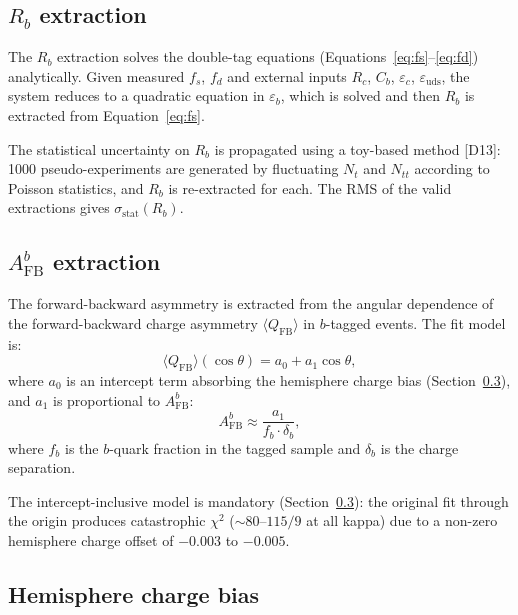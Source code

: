 \documentclass[11pt,a4paper]{article}
\begin{document}
\subsection{$R_b$ extraction}
\label{sec:stat_rb}

The $R_b$ extraction solves the double-tag equations (Equations~\ref{eq:fs}--\ref{eq:fd})
analytically. Given measured $f_s$, $f_d$ and external inputs $R_c$, $C_b$,
$\varepsilon_c$, $\varepsilon_\mathrm{uds}$, the system reduces to a quadratic
equation in $\varepsilon_b$, which is solved and then $R_b$ is extracted from
Equation~\ref{eq:fs}.

The statistical uncertainty on $R_b$ is propagated using a toy-based method [D13]:
1000 pseudo-experiments are generated by fluctuating $N_t$ and $N_{tt}$ according
to Poisson statistics, and $R_b$ is re-extracted for each. The RMS of the valid
extractions gives $\sigma_\mathrm{stat}(R_b)$.

\subsection{$A_\mathrm{FB}^b$ extraction}
\label{sec:stat_afb}

The forward-backward asymmetry is extracted from the angular dependence of the
forward-backward charge asymmetry $\langle Q_\mathrm{FB} \rangle$ in $b$-tagged events.
The fit model is:
\begin{equation}
\langle Q_\mathrm{FB} \rangle(\cos\theta) = a_0 + a_1 \cos\theta,
\label{eq:qfb_fit}
\end{equation}
where $a_0$ is an intercept term absorbing the hemisphere charge bias (Section~\ref{sec:afb_bias}),
and $a_1$ is proportional to $A_\mathrm{FB}^b$:
\begin{equation}
A_\mathrm{FB}^b \approx \frac{a_1}{f_b \cdot \delta_b},
\label{eq:afb_from_slope}
\end{equation}
where $f_b$ is the $b$-quark fraction in the tagged sample and $\delta_b$ is the
charge separation.

The intercept-inclusive model is mandatory (Section~\ref{sec:afb_bias}): the original
fit through the origin produces catastrophic $\chi^2$ ($\sim 80$--$115/9$ at all kappa)
due to a non-zero hemisphere charge offset of $-0.003$ to $-0.005$.

\subsection{Hemisphere charge bias}
\label{sec:afb_bias}
\end{document}
